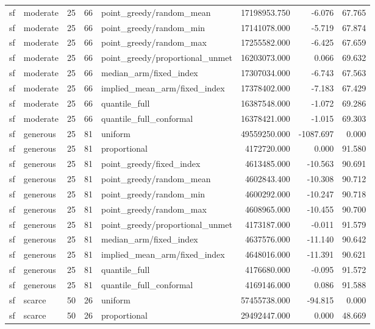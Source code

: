 \begin{tabular}{llrrlrrr}
sf & moderate & 25 & 66 & point\_greedy/random\_mean & 17198953.750 & -6.076 & 67.765 \\
sf & moderate & 25 & 66 & point\_greedy/random\_min & 17141078.000 & -5.719 & 67.874 \\
sf & moderate & 25 & 66 & point\_greedy/random\_max & 17255582.000 & -6.425 & 67.659 \\
sf & moderate & 25 & 66 & point\_greedy/proportional\_unmet & 16203073.000 & 0.066 & 69.632 \\
sf & moderate & 25 & 66 & median\_arm/fixed\_index & 17307034.000 & -6.743 & 67.563 \\
sf & moderate & 25 & 66 & implied\_mean\_arm/fixed\_index & 17378402.000 & -7.183 & 67.429 \\
sf & moderate & 25 & 66 & quantile\_full & 16387548.000 & -1.072 & 69.286 \\
sf & moderate & 25 & 66 & quantile\_full\_conformal & 16378421.000 & -1.015 & 69.303 \\
sf & generous & 25 & 81 & uniform & 49559250.000 & -1087.697 & 0.000 \\
sf & generous & 25 & 81 & proportional & 4172720.000 & 0.000 & 91.580 \\
sf & generous & 25 & 81 & point\_greedy/fixed\_index & 4613485.000 & -10.563 & 90.691 \\
sf & generous & 25 & 81 & point\_greedy/random\_mean & 4602843.400 & -10.308 & 90.712 \\
sf & generous & 25 & 81 & point\_greedy/random\_min & 4600292.000 & -10.247 & 90.718 \\
sf & generous & 25 & 81 & point\_greedy/random\_max & 4608965.000 & -10.455 & 90.700 \\
sf & generous & 25 & 81 & point\_greedy/proportional\_unmet & 4173187.000 & -0.011 & 91.579 \\
sf & generous & 25 & 81 & median\_arm/fixed\_index & 4637576.000 & -11.140 & 90.642 \\
sf & generous & 25 & 81 & implied\_mean\_arm/fixed\_index & 4648016.000 & -11.391 & 90.621 \\
sf & generous & 25 & 81 & quantile\_full & 4176680.000 & -0.095 & 91.572 \\
sf & generous & 25 & 81 & quantile\_full\_conformal & 4169146.000 & 0.086 & 91.588 \\
sf & scarce & 50 & 26 & uniform & 57455738.000 & -94.815 & 0.000 \\
sf & scarce & 50 & 26 & proportional & 29492447.000 & 0.000 & 48.669 \\

\end{tabular}

